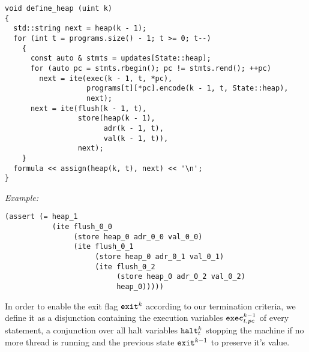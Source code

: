 \begin{lstlisting}[style=c++]
void define_heap (uint k)
{
  std::string next = heap(k - 1);
  for (int t = programs.size() - 1; t >= 0; t--)
    {
      const auto & stmts = updates[State::heap];
      for (auto pc = stmts.rbegin(); pc != stmts.rend(); ++pc)
        next = ite(exec(k - 1, t, *pc),
                   programs[t][*pc].encode(k - 1, t, State::heap),
                   next);
      next = ite(flush(k - 1, t),
                 store(heap(k - 1),
                       adr(k - 1, t),
                       val(k - 1, t)),
                 next);
    }
  formula << assign(heap(k, t), next) << '\n';
}
\end{lstlisting}

\noindent
\emph{Example:} 

\begin{lstlisting}[style=smtlib]
(assert (= heap_1
           (ite flush_0_0
                (store heap_0 adr_0_0 val_0_0)
                (ite flush_0_1
                     (store heap_0 adr_0_1 val_0_1)
                     (ite flush_0_2
                          (store heap_0 adr_0_2 val_0_2)
                          heap_0)))))
\end{lstlisting}


%
%
%
%

\noindent
In order to enable the exit flag $\texttt{exit}^k$ according to our termination criteria, we define it as a disjunction containing the execution variables $\texttt{exec}^{k - 1}_{t, pc}$ of every  statement, a conjunction over all halt variables $\texttt{halt}^k_t$ stopping the machine if no more thread is running and the previous state $\texttt{exit}^{k - 1}$ to preserve it's value.

